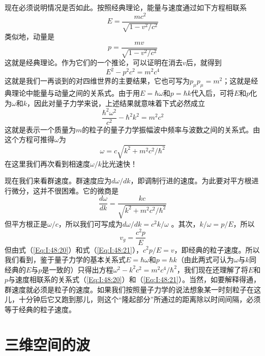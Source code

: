 现在必须说明情况是否如此。按照经典理论，能量与速度通过如下方程相联系
\begin{equation}
    \label{Eq:I:48:20}
    E = \frac{mc^2}{\sqrt{1-v^2/c^2}}
\end{equation}
类似地，动量是
\begin{equation}
    \label{Eq:I:48:21}
    p = \frac{mv}{\sqrt{1-v^2/c^2}}
\end{equation}
这就是经典理论。作为它们的一个推论，可以证明在消去$v$后，就得到
\begin{equation*}
    E^2 - p^2c^2 = m^2c^4
\end{equation*}
这就是我们一再谈到的对四维世界的主要结果，它也可写为$p_\mu p_\mu =m^2$；这就是经典理论中能量与动量之间的关系式。由于用$E=\hbar\omega$和$p=\hbar k$代入后，可将$E$和$p$化为$\omega$和$k$，因此对量子力学来说，上述结果就意味着下式必然成立
\begin{equation}
    \label{Eq:I:48:22}
    \frac{\hbar^2\omega^2}{c^2} - \hbar^2 k^2 = m^2c^2
\end{equation}
这就是表示一个质量为$m$的粒子的量子力学振幅波中频率与波数之间的关系式。由这个方程可推得$\omega$为
\begin{equation*}
    \omega = c\sqrt{k^2 + m^2c^2/\hbar^2}
\end{equation*}
在这里我们再次看到相速度$\omega /k$比光速快！

现在我们来看群速度。群速度应为$d\omega /dk$，即调制行进的速度。为此要对平方根进行微分，这并不很困难。它的微商是
\begin{equation*}
    \frac{d\omega}{dk} = \frac{kc}{\sqrt{k^2 + m^2c^2/\hbar^2}}
\end{equation*}
但平方根正是$\omega/c$，所以我们可写成为$d\omega/dk =c^2 k /\omega$ 。其次，$k /\omega =p /E$，所以
\begin{equation*}
    v_g = \frac{c^2p}{E}
\end{equation*}
但由式（\ref{Eq:I:48:20}）和式（\ref{Eq:I:48:21}），$c^2 p /E =v$，即经典的粒子速度。所以我们看到，鉴于量子力学的基本关系式$E=\hbar\omega$和$p=\hbar k$（由此两式可认为$\omega$与$k$同经典的$E$与$p$是一致的）只得出方程$\omega^2 - k^2c^2 = m^2c^4/\hbar^2$，我们现在还理解了将$E$和$p$与速度相联系的关系式（\ref{Eq:I:48:20}）和（\ref{Eq:I:48:21}）。当然，如要解释得通，群速度就必须是粒子的速度。如果我们按照量子力学的说法想象某一时刻粒子在这儿，十分钟后它又跑到那儿，则这个“隆起部分”所通过的距离除以时间间隔，必须等于经典的粒子速度。

\section{三维空间的波}

